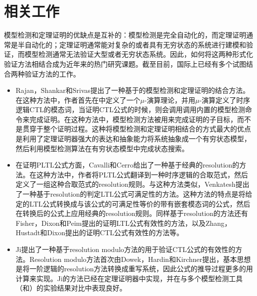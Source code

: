 \section{相关工作}
模型检测和定理证明的优缺点是互补的：模型检测是完全自动化的，而定理证明通常是半自动化的；定理证明通常能对复杂的或者具有无穷状态的系统进行建模和验证，而模型检测通常无法验证大型或者无穷状态系统。因此，如何将这两种形式化验证方法相结合成为近年来的热门研究课题。截至目前，国际上已经有多个试图结合两种验证方法的工作。
\begin{itemize}
	\item Rajan，Shankar和Srivas提出了一种基于的模型检测和定理证明的结合方法\cite{RajanSS95}。在这种方法中，作者首先在中定义了一个$\mu$-演算理论，并用$\mu$-演算定义了时序逻辑\textsf{CTL}的模态词，当证明\textsf{CTL}公式的时候，则会调用调用内置的模型检测命令来完成证明。在这种方法中，模型检测方法被用来完成证明的子目标，而不是贯穿于整个证明过程。这种将模型检测和定理证明相结合的方式最大的优点是利用了定理证明器强大的表达和抽象能力将系统抽象成一个有穷状态模型，然后利用模型检测算法在有穷状态模型中完成状态搜索。
	\item 在证明\textsf{PLTL}公式方面，Cavalli和Cerro给出了一种基于经典的resolution的方法\cite{CavalliC84}。在这种方法中，作者将\textsf{PLTL}公式翻译到一种时序逻辑的合取范式，然后定义了一组这种合取范式的resolution规则。与这种方法类似，Venkatesh提出了一种基于resolution的判定\textsf{LTL}公式可满足性的方法\cite{Venkatesh85}。这种方法的特点是将给定的\textsf{LTL}公式转换成与该公式的可满足性等价的带有嵌套模态词的公式，然后在转换后的公式上应用经典的resolution规则。同样基于resolution的方法还有Fisher，Dixon和Peim提出的证明\textsf{LTL}公式有效性的方法\cite{FisherDP01}，以及Zhang，Hustadt和Dixon提出的证明\textsf{CTL}公式有效性的方法\cite{ZhangHD14}等。
	\item Ji提出了一种基于resolution modulo方法的用于验证\textsf{CTL}公式的有效性的方法\cite{Ji15}。Resolution modulo方法首次由Dowek，Hardin和Kirchner提出\cite{DowekHK03,Dowek10}，基本思想是将一阶逻辑的resolution方法转换成重写系统，因此公式的推导过程更多的用计算来实现。Ji的方法已经在定理证明器中实现，并在与多个模型检测工具（\nusmv{}和\verds{}）的实验结果对比中表现良好。
\end{itemize}
